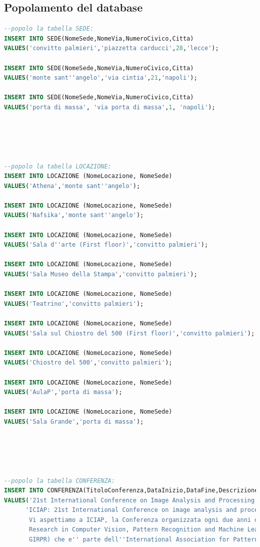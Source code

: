 \documentclass[a4page]{article}
\begin{document}
\subsection{Popolamento del database}
\begin{lstlisting}[language=SQL,
        deletekeywords={IDENTITY,INT},
        morekeywords={clustered},    
        framesep=10pt,
        framextopmargin=10pt]
--popolo la tabella SEDE:
INSERT INTO SEDE(NomeSede,NomeVia,NumeroCivico,Citta)
VALUES('convitto palmieri','piazzetta carducci',28,'lecce');

INSERT INTO SEDE(NomeSede,NomeVia,NumeroCivico,Citta)
VALUES('monte sant''angelo','via cintia',21,'napoli');

INSERT INTO SEDE(NomeSede,NomeVia,NumeroCivico,Citta)
VALUES('porta di massa', 'via porta di massa',1, 'napoli');





--popolo la tabella LOCAZIONE:
INSERT INTO LOCAZIONE (NomeLocazione, NomeSede)
VALUES('Athena','monte sant''angelo');

INSERT INTO LOCAZIONE (NomeLocazione, NomeSede)
VALUES('Nafsika','monte sant''angelo');

INSERT INTO LOCAZIONE (NomeLocazione, NomeSede)
VALUES('Sala d''arte (First floor)','convitto palmieri');

INSERT INTO LOCAZIONE (NomeLocazione, NomeSede)
VALUES('Sala Museo della Stampa','convitto palmieri');

INSERT INTO LOCAZIONE (NomeLocazione, NomeSede)
VALUES('Teatrino','convitto palmieri');

INSERT INTO LOCAZIONE (NomeLocazione, NomeSede)
VALUES('Sala sul Chiostro del 500 (First floor)','convitto palmieri');

INSERT INTO LOCAZIONE (NomeLocazione, NomeSede)
VALUES('Chiostro del 500','convitto palmieri');

INSERT INTO LOCAZIONE (NomeLocazione, NomeSede)
VALUES('AulaP','porta di massa');

INSERT INTO LOCAZIONE (NomeLocazione, NomeSede)
VALUES('Sala Grande','porta di massa');





--popolo la tabella CONFERENZA:
INSERT INTO CONFERENZA(TitoloConferenza,DataInizio,DataFine,Descrizione,NomeSede)
VALUES('21st International Conference on Image Analysis and Processing', '23/05/2022','27/05/2022',
	  'ICIAP: 21st International Conference on image analysis and processing 24 May 2022
	   Vi aspettiamo a ICIAP, la Conferenza organizzata ogni due anni dall''Association for
	   Research in Computer Vision, Pattern Recognition and Machine Learning (CVPL, ex
	   GIRPR) che e'' parte dell''International Association for Pattern Recognition (IAPR).','convitto palmieri');
	


\end{lstlisting}
\end{document}
